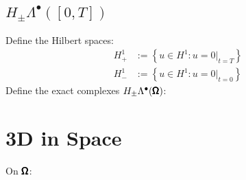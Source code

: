         \subsection*{$H_{\pm}\Lambda^{\bullet}([0, T])$}
            Define the Hilbert spaces:
            \begin{align}
                H^{1}_{+}  &:=  \left\{u \in H^{1} : u = 0|_{t = T}\right\}  \\
                H^{1}_{-}  &:=  \left\{u \in H^{1} : u = 0|_{t = 0}\right\}
            \end{align}
            Define the exact complexes $H_{\pm}\Lambda^{\bullet}(\pmb{\mathsf{\Omega}})$:
            \begin{center}\end{center}
        
    \section{3D in Space}
        On $\pmb{\mathsf{\Omega}}$:

